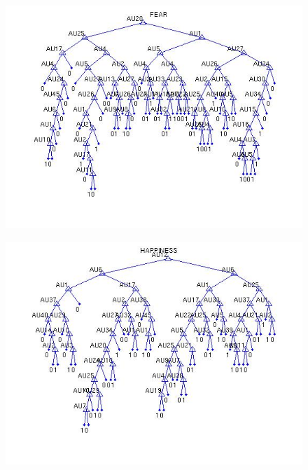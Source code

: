 \documentclass[11pt]{amsart}
\begin{document}
\begin{figure}[h]
\begin{center}
\includegraphics[scale=0.6]{fear.jpg}
\end{center}
\end{figure}

\begin{figure}[h]
\includegraphics[width=\linewidth]{happiness.jpg}
\end{figure}
\end{document}

